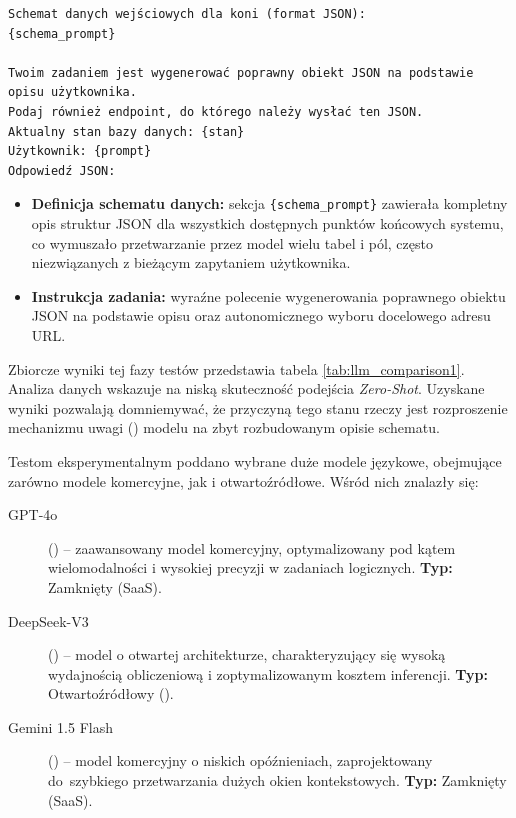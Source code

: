 \newpage
\begin{wykaz}[ht]
    \centering
    \begin{tcolorbox}[colback=gray!5, colframe=gray!50, arc=0mm, boxrule=0.5pt]
        \begin{verbatim}
Schemat danych wejściowych dla koni (format JSON):
{schema_prompt}

Twoim zadaniem jest wygenerować poprawny obiekt JSON na podstawie
opisu użytkownika. 
Podaj również endpoint, do którego należy wysłać ten JSON.
Aktualny stan bazy danych: {stan}
Użytkownik: {prompt}
Odpowiedź JSON:
        \end{verbatim}
    \end{tcolorbox}
    \caption{Struktura pierwotnego zapytania zawierająca pełny schemat bazy danych.}
    \label{wyk:prompt_verbatim}
\end{wykaz}

\begin{itemize}
    \item \textbf{Definicja schematu danych:} sekcja \texttt{\{schema\_prompt\}} zawierała kompletny opis struktur JSON dla wszystkich dostępnych punktów końcowych systemu, co wymuszało przetwarzanie przez model wielu tabel i pól, często niezwiązanych z bieżącym zapytaniem użytkownika.
    \item \textbf{Instrukcja zadania:} wyraźne polecenie wygenerowania poprawnego obiektu JSON na podstawie opisu oraz autonomicznego wyboru docelowego adresu URL.
\end{itemize}

Zbiorcze wyniki tej fazy testów przedstawia tabela \ref{tab:llm_comparison1}. Analiza danych wskazuje na niską skuteczność podejścia \textit{Zero-Shot}. Uzyskane wyniki pozwalają domniemywać, że przyczyną tego stanu rzeczy jest rozproszenie mechanizmu uwagi () modelu na zbyt rozbudowanym opisie schematu. %

Testom eksperymentalnym poddano wybrane duże modele językowe, obejmujące zarówno modele komercyjne, jak i otwartoźródłowe. Wśród nich znalazły się: 
\begin{description}
    \item[GPT-4o] () -- zaawansowany model komercyjny, optymalizowany pod kątem wielomodalności i wysokiej precyzji w zadaniach logicznych. \textbf{Typ:} Zamknięty (SaaS).
    
    \item[DeepSeek-V3] () -- model o otwartej architekturze, charakteryzujący się wysoką wydajnością obliczeniową i zoptymalizowanym kosztem inferencji. \textbf{Typ:} Otwartoźródłowy ().
    
    \item[Gemini 1.5 Flash] () -- model komercyjny o niskich opóźnieniach, zaprojektowany do~szybkiego przetwarzania dużych okien kontekstowych. \textbf{Typ:} Zamknięty (SaaS).
\end{description}

